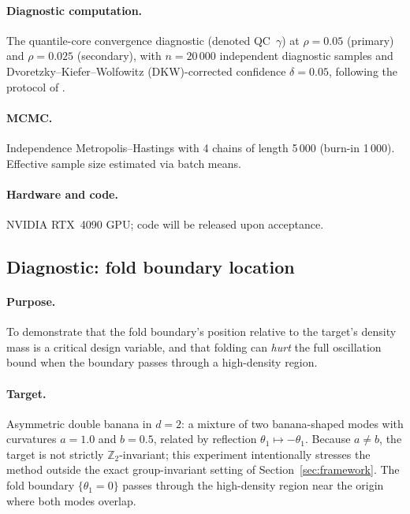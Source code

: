 \paragraph{Diagnostic computation.}
The quantile-core convergence diagnostic (denoted QC~$\gamma$)
at $\rho = 0.05$ (primary) and
$\rho = 0.025$ (secondary), with $n = 20\,000$ independent
diagnostic samples and Dvoretzky--Kiefer--Wolfowitz
(DKW)-corrected confidence $\delta = 0.05$,
following the protocol of \citet{CerTMCMC}.

\paragraph{MCMC.}
Independence Metropolis--Hastings with 4 chains of length 5\,000
(burn-in 1\,000).  Effective sample size estimated via
batch means.

\paragraph{Hardware and code.}
NVIDIA RTX~4090 GPU; code will be released upon acceptance.


\subsection{Diagnostic: fold boundary location}
\label{sec:exp_banana}

\paragraph{Purpose.}
To demonstrate that the fold boundary's position relative to
the target's density mass is a critical design variable,
and that folding can \emph{hurt} the full oscillation bound
when the boundary passes through a high-density region.

\paragraph{Target.}
Asymmetric double banana in $d = 2$: a mixture of two
banana-shaped modes with curvatures $a = 1.0$ and $b = 0.5$,
related by reflection $\theta_1 \mapsto -\theta_1$.
Because $a \neq b$, the target is not strictly
$\mathbb{Z}_2$-invariant; this experiment intentionally
stresses the method outside the exact group-invariant setting
of Section~\ref{sec:framework}.
The fold boundary $\{\theta_1 = 0\}$ passes through the
high-density region near the origin where both modes overlap.


